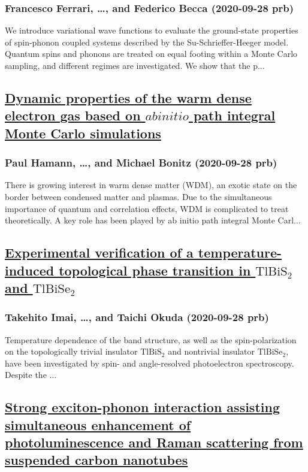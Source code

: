 \subsubsection*{Francesco Ferrari, \dots, and Federico Becca (2020-09-28 prb)}
We introduce variational wave functions to evaluate the ground-state properties of spin-phonon coupled systems described by the Su-Schrieffer-Heeger model. Quantum spins and phonons are treated on equal footing within a Monte Carlo sampling, and different regimes are investigated. We show that the p...
\subsection*{\href{http://link.aps.org/doi/10.1103/PhysRevB.102.125150}{Dynamic properties of the warm dense electron gas based on $ab initio$ path integral Monte Carlo simulations}}
\subsubsection*{Paul Hamann, \dots, and Michael Bonitz (2020-09-28 prb)}
There is growing interest in warm dense matter (WDM), an exotic state on the border between condensed matter and plasmas. Due to the simultaneous importance of quantum and correlation effects, WDM is complicated to treat theoretically. A key role has been played by ab initio path integral Monte Carl...
\subsection*{\href{http://link.aps.org/doi/10.1103/PhysRevB.102.125151}{Experimental verification of a temperature-induced topological phase transition in ${\mathrm{TlBiS}}_{2}$ and $\mathrm{Tl}\mathrm{Bi}{\mathrm{Se}}_{2}$}}
\subsubsection*{Takehito Imai, \dots, and Taichi Okuda (2020-09-28 prb)}
Temperature dependence of the band structure, as well as the spin-polarization on the topologically trivial insulator ${\mathrm{TlBiS}}_{2}$ and nontrivial insulator $\mathrm{Tl}\mathrm{Bi}{\mathrm{Se}}_{2}$, have been investigated by spin- and angle-resolved photoelectron spectroscopy. Despite the ...
\subsection*{\href{http://link.aps.org/doi/10.1103/PhysRevB.102.125432}{Strong exciton-phonon interaction assisting simultaneous enhancement of photoluminescence and Raman scattering from suspended carbon nanotubes}}
